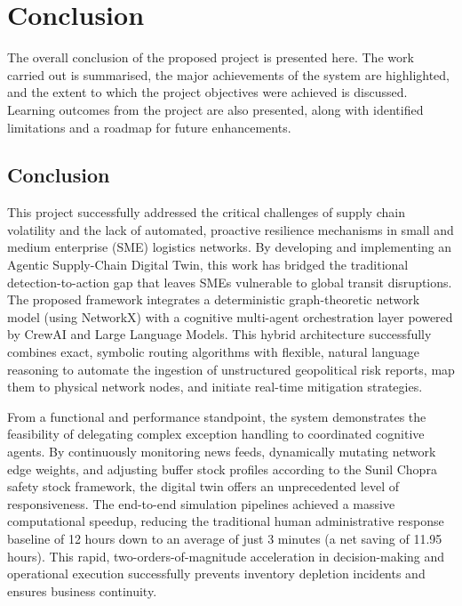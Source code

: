 \chapter[Conclusion]{Conclusion}

The overall conclusion of the proposed project is presented here. The work carried out is summarised, the major achievements of the system are highlighted, and the extent to which the project objectives were achieved is discussed. Learning outcomes from the project are also presented, along with identified limitations and a roadmap for future enhancements.

\section[Conclusion]{Conclusion}
This project successfully addressed the critical challenges of supply chain volatility and the lack of automated, proactive resilience mechanisms in small and medium enterprise (SME) logistics networks. By developing and implementing an Agentic Supply-Chain Digital Twin, this work has bridged the traditional detection-to-action gap that leaves SMEs vulnerable to global transit disruptions. The proposed framework integrates a deterministic graph-theoretic network model (using NetworkX) with a cognitive multi-agent orchestration layer powered by CrewAI and Large Language Models. This hybrid architecture successfully combines exact, symbolic routing algorithms with flexible, natural language reasoning to automate the ingestion of unstructured geopolitical risk reports, map them to physical network nodes, and initiate real-time mitigation strategies.

From a functional and performance standpoint, the system demonstrates the feasibility of delegating complex exception handling to coordinated cognitive agents. By continuously monitoring news feeds, dynamically mutating network edge weights, and adjusting buffer stock profiles according to the Sunil Chopra safety stock framework, the digital twin offers an unprecedented level of responsiveness. The end-to-end simulation pipelines achieved a massive computational speedup, reducing the traditional human administrative response baseline of 12 hours down to an average of just 3 minutes (a net saving of 11.95 hours). This rapid, two-orders-of-magnitude acceleration in decision-making and operational execution successfully prevents inventory depletion incidents and ensures business continuity.


